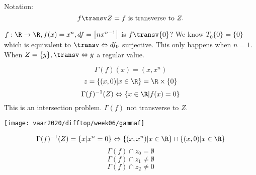 \begin{definition}
  Notation:
    $$f \transv Z= f\text{ is transverse to } Z.$$
\end{definition}
\begin{example}
  $f: \R \to \R, f(x)=x^n, df =
\begin{bmatrix}
  nx^{n-1}
\end{bmatrix}
  $ is $f \transv \{0\}$? We know $T_0\{0\}=\{0\}$ which is equivalent to $\transv \Leftrightarrow df_0$ surjective. This only happens when $n=1$. When $Z=\{y\}, \transv \Leftrightarrow  y$ a regular value.
\end{example}
\begin{example}
  $$\Gamma(f)(x)=(x, x^n)$$
  $$z= \{(x,0)| x\in \R\}=\R\times \{0\}$$
  $$\Gamma(f)^{-1}(Z) \Leftrightarrow \{x\in \R | f(x)=0\}$$
  This is an intersection problem. $\Gamma(f)$ not transverse to $Z$.
  \begin{center}
  \texttt{[image: vaar2020/difftop/week06/gammaf]}
  \end{center}
  $$\Gamma(f)^{-1}(Z)=\{x| x^n = 0\} \Leftrightarrow \{(x,x^n) | x\in \R\} \cap \{(x,0)| x\in \R\}$$
  $$\Gamma(f)\cap z_0= \emptyset$$
  $$\Gamma(f) \cap z_1\neq \emptyset$$
  $$\Gamma(f)\cap z_2 \neq 0$$

\end{example}

